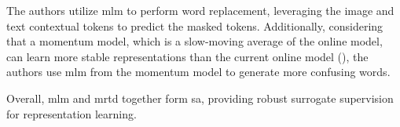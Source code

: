 The authors utilize \acrfull{mlm} to perform word replacement, leveraging the image and text contextual tokens to predict the masked tokens. Additionally, considering that a momentum model, which is a slow-moving average of the online model, can learn more stable representations than the current online model (\cite{grill2020bootstraplatentnewapproach}), the authors use \acrshort{mlm} from the momentum model to generate more confusing words. 

Overall, \acrshort{mlm} and \acrshort{mrtd} together form \acrshort{sa}, providing robust surrogate supervision for representation learning.



